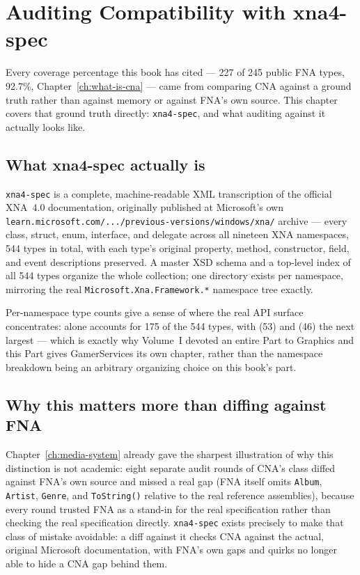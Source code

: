 \chapter{Auditing Compatibility with xna4-spec}
\label{ch:xna4-spec-auditing}

Every coverage percentage this book has cited --- 227 of 245 public FNA types, 92.7\%,
Chapter~\ref{ch:what-is-cna} --- came from comparing CNA against a ground truth rather than
against memory or against FNA's own source. This chapter covers that ground truth directly:
\texttt{xna4-spec}, and what auditing against it actually looks like.

\section{What xna4-spec actually is}

\texttt{xna4-spec} is a complete, machine-readable XML transcription of the official XNA~4.0
documentation, originally published at Microsoft's own
\texttt{learn.microsoft.com/.../previous-versions/windows/xna/} archive --- every class,
struct, enum, interface, and delegate across all nineteen XNA namespaces, 544 types in total,
with each type's original property, method, constructor, field, and event descriptions
preserved. A master XSD schema and a top-level index of all 544 types organize the whole
collection; one directory exists per namespace, mirroring the real
\texttt{Microsoft.Xna.Framework.*} namespace tree exactly.

Per-namespace type counts give a sense of where the real API surface concentrates:
 alone accounts for 175 of the 544 types, with
 (53) and  (46) the next largest ---
which is exactly why Volume~I devoted an entire Part to Graphics and this Part gives
GamerServices its own chapter, rather than the namespace breakdown being an arbitrary
organizing choice on this book's part.

\section{Why this matters more than diffing against FNA}

Chapter~\ref{ch:media-system} already gave the sharpest illustration of why this distinction
is not academic: eight separate audit rounds of CNA's  class diffed against
FNA's own source and missed a real gap (FNA itself omits \texttt{Album}, \texttt{Artist},
\texttt{Genre}, and \texttt{ToString()} relative to the real reference assemblies), because
every round trusted FNA as a stand-in for the real specification rather than checking the
real specification directly. \texttt{xna4-spec} exists precisely to make that class of
mistake avoidable: a diff against it checks CNA against the actual, original Microsoft
documentation, with FNA's own gaps and quirks no longer able to hide a CNA gap behind them.

